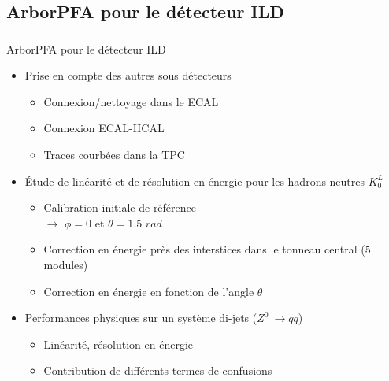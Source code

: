 \documentclass[8pt]{beamer}
\begin{document}
  \subsection{ArborPFA pour le détecteur ILD}

  \begin{frame}
  \frametitle{\secname}
  \framesubtitle{\subsecname}
    \begin{minipage}{0.53\linewidth}
      \begin{block}{ArborPFA pour le détecteur ILD}
        \begin{itemize}
          \item Prise en compte des autres sous détecteurs
          \begin{itemize}
            \item Connexion/nettoyage dans le ECAL
            \item Connexion ECAL-HCAL
            \item Traces courbées dans la TPC
          \end{itemize}
          \item Étude de linéarité et de résolution en énergie pour les hadrons neutres $K_{0}^{L}$
          \begin{itemize}
            \item Calibration initiale de référence \\
            $\rightarrow$ $\phi=0$ et $\theta=1.5$ $rad$
            \item Correction en énergie près des interstices dans le tonneau central (5 modules)
            \item Correction en énergie en fonction de l'angle $\theta$
          \end{itemize}
          \item Performances physiques sur un système di-jets ($Z^0~\rightarrow q\bar{q}$)
          \begin{itemize}
            \item Linéarité, résolution en énergie
            \item Contribution de différents termes de confusions
          \end{itemize}
        \end{itemize}
      \end{block}
    \end{minipage} ~~~~\hfill
    \begin{minipage}{0.43\linewidth}
      \begin{center}

\end{center}
\end{minipage}
\end{frame}
\end{document}
